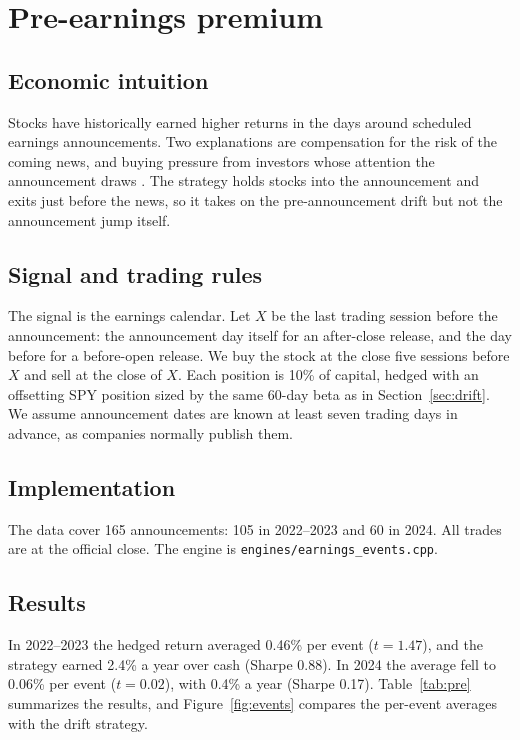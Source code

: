 \documentclass[../main.tex]{subfiles}
\begin{document}
\section{Pre-earnings premium}\label{sec:pre}

\subsection{Economic intuition}
Stocks have historically earned higher returns in the days around scheduled earnings announcements. Two explanations are compensation for the risk of the coming news, and buying pressure from investors whose attention the announcement draws \citep{frazzini2007,barber2013}. The strategy holds stocks into the announcement and exits just before the news, so it takes on the pre-announcement drift but not the announcement jump itself.

\subsection{Signal and trading rules}
The signal is the earnings calendar. Let $X$ be the last trading session before the announcement: the announcement day itself for an after-close release, and the day before for a before-open release. We buy the stock at the close five sessions before $X$ and sell at the close of $X$. Each position is 10\% of capital, hedged with an offsetting SPY position sized by the same 60-day beta as in Section~\ref{sec:drift}. We assume announcement dates are known at least seven trading days in advance, as companies normally publish them.

\subsection{Implementation}
The data cover 165 announcements: 105 in 2022--2023 and 60 in 2024. All trades are at the official close. The engine is \texttt{engines/earnings\_events.cpp}.

\subsection{Results}
In 2022--2023 the hedged return averaged 0.46\% per event ($t = 1.47$), and the strategy earned 2.4\% a year over cash (Sharpe 0.88). In 2024 the average fell to 0.06\% per event ($t = 0.02$), with 0.4\% a year (Sharpe 0.17). Table~\ref{tab:pre} summarizes the results, and Figure~\ref{fig:events} compares the per-event averages with the drift strategy.
\end{document}
